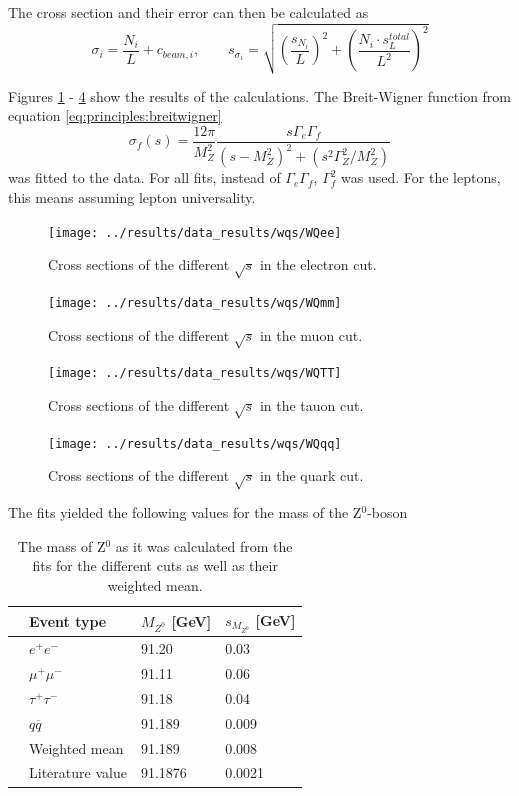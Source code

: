 The cross section and their error can then be calculated as
\begin{equation}
\sigma_i=\frac{N_i}{L}+c_{beam,i}, \qquad s_{\sigma_i}=\sqrt{(\frac{s_{N_i}}{L})^2+(\frac{N_i\cdot s_L^{total}}{L^2})^2}
\end{equation}

Figures \ref{fig:WQee} - \ref{fig:WQqq} show the results of the calculations. The Breit-Wigner function from equation \ref{eq:principles:breitwigner}
\begin{equation}
\sigma_f(s) = \frac{12\pi}{M_Z^2} \frac{s\Gamma_e\Gamma_f}{(s-M_Z^2)^2+(s^2\Gamma_Z^2/M_Z^2)}
\end{equation}
was fitted to the data. For all fits, instead of $\Gamma_e\Gamma_f$, $\Gamma_f^2$ was used. For the leptons, this means assuming lepton universality.

\begin{figure}[H]
\centering
\texttt{[image: ../results/data\_results/wqs/WQee]}
\caption[Cross sections for electron cut]{Cross sections of the different $\sqrt{s}$ in the electron cut.}
\label{fig:WQee}
\end{figure}

\begin{figure}[H]
\centering
\texttt{[image: ../results/data\_results/wqs/WQmm]}
\caption[Cross sections for muon cut]{Cross sections of the different $\sqrt{s}$ in the muon cut.}
\label{fig:WQmm}
\end{figure}

\begin{figure}[H]
	\centering
	\texttt{[image: ../results/data\_results/wqs/WQTT]}
	\caption[Cross sections for tauon cut]{Cross sections of the different $\sqrt{s}$ in the tauon cut.}
	\label{fig:WQTT}
\end{figure}

\begin{figure}[H]
\centering
\texttt{[image: ../results/data\_results/wqs/WQqq]}
\caption[Cross sections for quark cut]{Cross sections of the different $\sqrt{s}$ in the quark cut.}
\label{fig:WQqq}
\end{figure}
\newpage
The fits yielded the following values for the mass of the Z$^0$-boson
\begin{table}[H]\centering
	\begin{tabular}{@{}llll@{}}
		\toprule
		&Event type&$M_{Z^0}$ [GeV]&$s_{M_{Z^0}}$ [GeV]\\
		\midrule
		&$e^+e^-$&91.20&0.03\\
		&$\mu^+\mu^-$&91.11&0.06\\
		&$\tau^+\tau^-$&91.18&0.04\\
		&$q\overline{q}$&91.189&0.009\\
		\midrule
		&Weighted mean&91.189&0.008\\
		&Literature value&91.1876&0.0021\\
		\bottomrule
	\end{tabular}
	\caption[Breit-Wigner fit results: $M_{Z^0}$]{The mass of Z$^0$ as it was calculated from the fits for the different cuts as well as their weighted mean.}
	\label{tb:Z0massfitresults}
\end{table}

